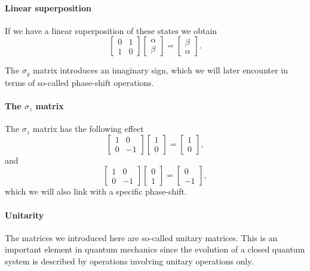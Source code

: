 \paragraph{Linear superposition}
If we have a linear superposition of these states we obtain
\[
\begin{bmatrix}0 & 1 \\ 1 & 0 \end{bmatrix}\begin{bmatrix}\alpha \\ \beta \end{bmatrix}=\begin{bmatrix}\beta \\ \alpha \end{bmatrix}.
\]

The $\sigma_y$ matrix introduces an imaginary sign, which we will later encounter in terms of so-called phase-shift operations.


\paragraph{The $\sigma_z$ matrix}
The $\sigma_z$ matrix has the following effect
\[
\begin{bmatrix} 1 & 0 \\ 0 & -1 \end{bmatrix}\begin{bmatrix} 1 \\ 0 \end{bmatrix}=\begin{bmatrix} 1  \\ 0  \end{bmatrix},
\]
and 
\[
\begin{bmatrix} 1 & 0 \\ 0 & -1 \end{bmatrix}\begin{bmatrix} 0 \\ 1 \end{bmatrix}=\begin{bmatrix} 0  \\ -1  \end{bmatrix},
\]
which we will also link with a specific phase-shift.


\paragraph{Unitarity}

The matrices we introduced here are so-called unitary matrices. This
is an important element in quantum mechanics since the evolution of a
closed quantum system is described by operations involving unitary
operations only.

